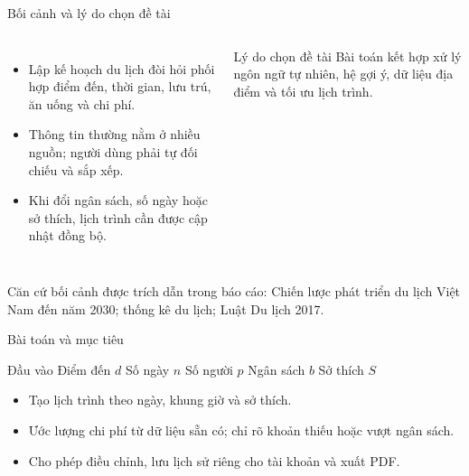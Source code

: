 \documentclass[aspectratio=169,11pt]{beamer}
\begin{document}
\begin{frame}{Bối cảnh và lý do chọn đề tài}
  \begin{columns}[T,onlytextwidth]
      \begin{itemize}
        \item Lập kế hoạch du lịch đòi hỏi phối hợp điểm đến, thời gian, lưu trú, ăn uống và chi phí.
        \item Thông tin thường nằm ở nhiều nguồn; người dùng phải tự đối chiếu và sắp xếp.
        \item Khi đổi ngân sách, số ngày hoặc sở thích, lịch trình cần được cập nhật đồng bộ.
      \end{itemize}
      \vspace{0.2cm}
      \begin{alertblock}{Lý do chọn đề tài}
        Bài toán kết hợp xử lý ngôn ngữ tự nhiên, hệ gợi ý, dữ liệu địa điểm và tối ưu lịch trình.
      \end{alertblock}
  \end{columns}
  \vspace{0.25cm}
  {\scriptsize\color{muted}Căn cứ bối cảnh được trích dẫn trong báo cáo: Chiến lược phát triển du lịch Việt Nam đến năm 2030; thống kê du lịch; Luật Du lịch 2017.}
\end{frame}

\begin{frame}{Bài toán và mục tiêu}
  \begin{block}{Đầu vào}
    \centering Điểm đến $d$ \quad Số ngày $n$ \quad Số người $p$ \quad Ngân sách $b$ \quad Sở thích $S$
  \end{block}
  \begin{center}
  \end{center}
  \begin{itemize}
    \item Tạo lịch trình theo ngày, khung giờ và sở thích.
    \item Ước lượng chi phí từ dữ liệu sẵn có; chỉ rõ khoản thiếu hoặc vượt ngân sách.
    \item Cho phép điều chỉnh, lưu lịch sử riêng cho tài khoản và xuất PDF.
  \end{itemize}
\end{frame}
\end{document}
